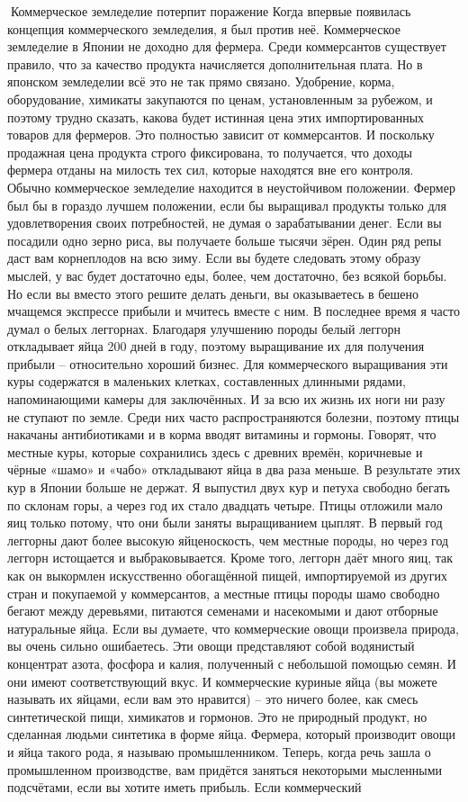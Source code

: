 \documentclass[a4paper]{book}
\begin{document}
Коммерческое земледелие потерпит поражение
Когда впервые появилась концепция коммерческого земледелия, я был против неё.
Коммерческое земледелие в Японии не доходно для фермера. Среди коммерсантов
существует правило, что за качество продукта начисляется дополнительная плата. Но в
японском земледелии всё это не так прямо связано. Удобрение, корма, оборудование,
химикаты закупаются по ценам, установленным за рубежом, и поэтому трудно сказать,
какова будет истинная цена этих импортированных товаров для фермеров. Это полностью
зависит от коммерсантов. И поскольку продажная цена продукта строго фиксирована, то
получается, что доходы фермера отданы на милость тех сил, которые находятся вне его
контроля.
Обычно коммерческое земледелие находится в неустойчивом положении. Фермер был
бы в гораздо лучшем положении, если бы выращивал продукты только для удовлетворения
своих потребностей, не думая о зарабатывании денег. Если вы посадили одно зерно риса, вы
получаете больше тысячи зёрен. Один ряд репы даст вам корнеплодов на всю зиму. Если вы
будете следовать этому образу мыслей, у вас будет достаточно еды, более, чем достаточно,
без всякой борьбы. Но если вы вместо этого решите делать деньги, вы оказываетесь в бешено
мчащемся экспрессе прибыли и мчитесь вместе с ним.
В последнее время я часто думал о белых леггорнах. Благодаря улучшению породы
белый леггорн откладывает яйца 200 дней в году, поэтому выращивание их для получения
прибыли – относительно хороший бизнес. Для коммерческого выращивания эти куры
содержатся в маленьких клетках, составленных длинными рядами, напоминающими камеры
для заключённых. И за всю их жизнь их ноги ни разу не ступают по земле. Среди них часто
распространяются болезни, поэтому птицы накачаны антибиотиками и в корма вводят
витамины и гормоны.
Говорят, что местные куры, которые сохранились здесь с древних времён, коричневые и
чёрные «шамо» и «чабо» откладывают яйца в два раза меньше. В результате этих кур в
Японии больше не держат. Я выпустил двух кур и петуха свободно бегать по склонам горы, а
через год их стало двадцать четыре. Птицы отложили мало яиц только потому, что они были
заняты выращиванием цыплят.
В первый год леггорны дают более высокую яйценоскость, чем местные породы, но
через год леггорн истощается и выбраковывается. Кроме того, леггорн даёт много яиц, так
как он выкормлен искусственно обогащённой пищей, импортируемой из других стран и
покупаемой у коммерсантов, а местные птицы породы шамо свободно бегают между
деревьями, питаются семенами и насекомыми и дают отборные натуральные яйца.
Если вы думаете, что коммерческие овощи произвела природа, вы очень сильно
ошибаетесь. Эти овощи представляют собой водянистый концентрат азота, фосфора и калия,
полученный с небольшой помощью семян. И они имеют соответствующий вкус. И
коммерческие куриные яйца (вы можете называть их яйцами, если вам это нравится) – это
ничего более, как смесь синтетической пищи, химикатов и гормонов. Это не природный
продукт, но сделанная людьми синтетика в форме яйца. Фермера, который производит овощи
и яйца такого рода, я называю промышленником.
Теперь, когда речь зашла о промышленном производстве, вам придётся заняться
некоторыми мысленными подсчётами, если вы хотите иметь прибыль. Если коммерческий
\end{document}
